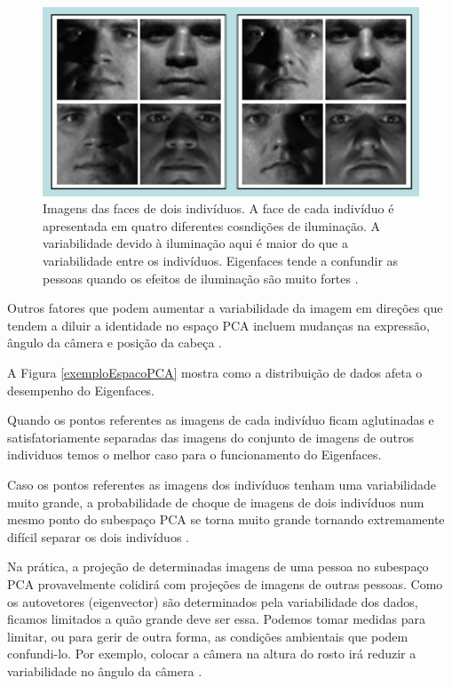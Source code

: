 	\begin{figure}[hbt]
		\begin{center}
			\includegraphics[width=14cm]{figuras/2.FundamentacaoTeorica/exemplosImagensIluminacaoo.png}
		\end{center}
		\caption{Imagens das faces de dois indivíduos. A face de cada indivíduo é apresentada em quatro diferentes cosndições de iluminação. A variabilidade devido à iluminação aqui é maior do que a variabilidade entre os indivíduos. Eigenfaces tende a confundir as pessoas quando os efeitos de iluminação são muito fortes \cite{hewitt}.}
		\label{exemplosImagensIluminacaoo}
	\end{figure}

Outros fatores que podem aumentar a variabilidade da imagem em direções que tendem a diluir a identidade no espaço PCA incluem mudanças na expressão, ângulo da câmera e posição da cabeça \cite{hewitt}.

A Figura \ref{exemploEspacoPCA} mostra como a distribuição de dados afeta o desempenho do Eigenfaces.

Quando os pontos referentes as imagens de cada indivíduo ficam aglutinadas e satisfatoriamente separadas das imagens do conjunto de imagens de outros individuos temos o melhor caso para o funcionamento do Eigenfaces.

Caso os pontos referentes as imagens dos indivíduos tenham uma variabilidade muito grande, a probabilidade de choque de imagens de dois indivíduos num mesmo ponto do subespaço PCA se torna muito grande tornando extremamente difícil separar os dois indivíduos \cite{hewitt}.

Na prática, a projeção de determinadas imagens de uma pessoa no subespaço PCA provavelmente colidirá com projeções de imagens de outras pessoas. Como os autovetores (eigenvector) são determinados pela variabilidade dos dados, ficamos limitados a quão grande deve ser essa. Podemos tomar medidas para limitar, ou para gerir de outra forma, as condições ambientais que podem confundi-lo. Por exemplo, colocar a câmera na altura do rosto irá reduzir a variabilidade no ângulo da câmera \cite{hewitt}.

